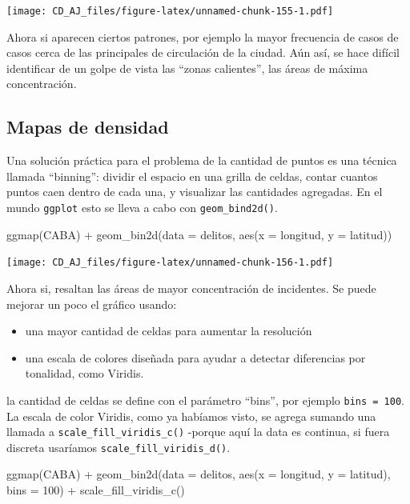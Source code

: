 \documentclass[
]{book}
\newenvironment{Shaded}{\begin{snugshade}}{\end{snugshade}}
\newcommand{\AttributeTok}[1]{\textcolor[rgb]{0.77,0.63,0.00}{#1}}
\newcommand{\DecValTok}[1]{\textcolor[rgb]{0.00,0.00,0.81}{#1}}
\newcommand{\FunctionTok}[1]{\textcolor[rgb]{0.00,0.00,0.00}{#1}}
\newcommand{\NormalTok}[1]{#1}
\newcommand{\SpecialCharTok}[1]{\textcolor[rgb]{0.00,0.00,0.00}{#1}}
\providecommand{\tightlist}{%
  \setlength{\itemsep}{0pt}\setlength{\parskip}{0pt}}
\begin{document}
\texttt{[image: CD\_AJ\_files/figure-latex/unnamed-chunk-155-1.pdf]}

Ahora si aparecen ciertos patrones, por ejemplo la mayor frecuencia de casos de casos cerca de las principales de circulación de la ciudad. Aún así, se hace difícil identificar de un golpe de vista las ``zonas calientes'', las áreas de máxima concentración.

\hypertarget{mapas-de-densidad}{%
\subsection{Mapas de densidad}\label{mapas-de-densidad}}

Una solución práctica para el problema de la cantidad de puntos es una técnica llamada ``binning'': dividir el espacio en una grilla de celdas, contar cuantos puntos caen dentro de cada una, y visualizar las cantidades agregadas. En el mundo \texttt{ggplot} esto se lleva a cabo con \texttt{geom\_bind2d()}.

\begin{Shaded}
\begin{Highlighting}[]
\FunctionTok{ggmap}\NormalTok{(CABA) }\SpecialCharTok{+}
    \FunctionTok{geom\_bin2d}\NormalTok{(}\AttributeTok{data =}\NormalTok{ delitos, }\FunctionTok{aes}\NormalTok{(}\AttributeTok{x =}\NormalTok{ longitud, }\AttributeTok{y =}\NormalTok{ latitud))}
\end{Highlighting}
\end{Shaded}

\texttt{[image: CD\_AJ\_files/figure-latex/unnamed-chunk-156-1.pdf]}

Ahora si, resaltan las áreas de mayor concentración de incidentes. Se puede mejorar un poco el gráfico usando:

\begin{itemize}
\tightlist
\item
  una mayor cantidad de celdas para aumentar la resolución
\item
  una escala de colores diseñada para ayudar a detectar diferencias por tonalidad, como Viridis.
\end{itemize}

la cantidad de celdas se define con el parámetro ``bins'', por ejemplo \texttt{bins\ =\ 100}. La escala de color Viridis, como ya habíamos visto, se agrega sumando una llamada a \texttt{scale\_fill\_viridis\_c()} -porque aquí la data es continua, si fuera discreta usaríamos \texttt{scale\_fill\_viridis\_d()}.

\begin{Shaded}
\begin{Highlighting}[]
\FunctionTok{ggmap}\NormalTok{(CABA) }\SpecialCharTok{+}
    \FunctionTok{geom\_bin2d}\NormalTok{(}\AttributeTok{data =}\NormalTok{ delitos, }\FunctionTok{aes}\NormalTok{(}\AttributeTok{x =}\NormalTok{ longitud, }\AttributeTok{y =}\NormalTok{ latitud), }\AttributeTok{bins =} \DecValTok{100}\NormalTok{) }\SpecialCharTok{+}
    \FunctionTok{scale\_fill\_viridis\_c}\NormalTok{()}
\end{Highlighting}
\end{Shaded}
\end{document}
